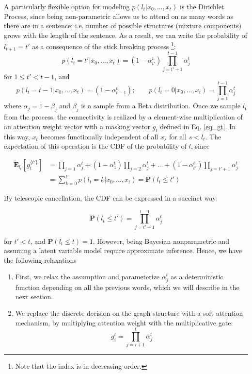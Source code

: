 \documentclass{article} \usepackage{iclr2018_conference,times}
\begin{document}
A particularly flexible option for modeling $p(l_{t}|x_0, ..., x_t)$ is the Dirichlet Process, since being non-parametric allows us to attend on as many words as there are in a sentence; 
i.e. number of possible structures (mixture components) grows with the length of the sentence.
As a result, we can write the probability of $l_{t+1}=t'$ as a consequence of the stick breaking process \footnote{Note that the index is in decreasing order.}:
\begin{equation}
p(l_{t}=t'|x_0, ...,x_t) = (1-\alpha_{t'}^{t})\prod_{j=t'+1}^{t-1}\alpha_j^{t}
\end{equation}
for $1\leq t'< t-1$, and 
\begin{equation}
p(l_{t}=t-1|x_0, ...,x_t) = (1-\alpha_{t-1}^{t}) ;\qquad p(l_{t}=0|x_0, ...,x_t) = \prod_{j=1}^{t-1}\alpha_j^{t}
\end{equation}
where $\alpha_j = 1 - \beta_j$ and $\beta_j$ is a sample from a Beta distribution. 
Once we sample $l_{t}$ from the process, the connectivity is realized by a element-wise multiplication of an attention weight vector with a masking vector $g_{t}$ defined in Eq. \ref{eq_gt}.
In this way, $x_t$ becomes functionally independent of all $x_s$ for all $s<l_{t}$.
The expectation of this operation is the CDF of the probability of $l$, since 




\begin{equation}
\begin{split}
\mathbf{E}_{l_{t}}[g_{t}^{\{t'\}}]
&=\prod_{j=1}\alpha_j^{t} + (1-\alpha_1^{t})\prod_{j=2}\alpha_j^{t} + ... + (1-\alpha_{t'}^{t})\prod_{j=t'+1}\alpha_j^{t} \\
&= \sum_{k=0}^{t'} p(l_{t}=k|x_0, ...,x_t) = \mathbf{P}(l_{t}\leq t')
\end{split}
\end{equation}

By telescopic cancellation, the CDF can be expressed in a succinct way: 

\begin{equation}
\mathbf{P}(l_{t}\leq t') = \prod_{j=t'+1}^{t-1}\alpha_j^{t}
\end{equation}

for $t'<t$, and $\mathbf{P}(l_{t}\leq t) = 1$.
However, being Bayesian nonparametric and assuming a latent variable model require approximate inference. 
Hence, we have the following relaxations

\begin{enumerate}
	\item First, we relax the assumption and parameterize $\alpha_j^{t}$ as a deterministic function depending on all the previous words, which we will describe in the next section. 
	\item We replace the discrete decision on the graph structure with a soft attention mechanism, by multiplying attention weight with the multiplicative gate:
    \begin{equation}
      g_i^{t} = \prod_{j=i+1}^t \alpha_j^{t}
    \end{equation}
\end{enumerate}
\end{document}
